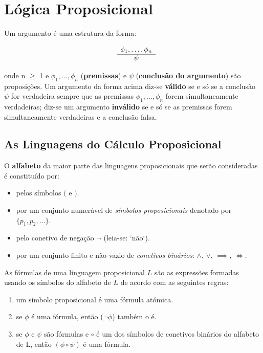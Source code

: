 \section{Lógica Proposicional}

\begin{definition}
    Um argumento é uma estrutura da forma:

    \[
    \begin{array}{ cc }
        & \phi_1, \ldots, \phi_n \\
        \cline{2-2}
        & \psi
    \end{array}
    \]

    onde n $\ge$ 1 e $\phi_1,\ldots{},\phi_n$ (\textbf{premissas}) e $\psi$ (\textbf{conclusão do argumento}) são proposições.
    Um argumento da forma acima diz-se \textbf{válido} se e só se a conclusão $\psi$ for verdadeira sempre que as premissas $\phi_1,\ldots,\phi_n$ forem simultaneamente verdadeiras; diz-se um argumento \textbf{inválido} se e só se as premissas forem simultaneamente verdadeiras e a conclusão falsa.

\end{definition}

\subsection{As Linguagens do Cálculo Proposicional}
O \textbf{alfabeto} da maior parte das linguagens proposicionais que serão consideradas é constituído por:

\begin{itemize}
    \item pelos símbolos $($ e $)$.
    \item por um conjunto numerável de \textit{símbolos proposicionais} denotado por $\{ p_1,p_2, \ldots \}$.
    \item pelo conetivo de negação $\neg$ (leia-se: `não`).
    \item por um conjunto finito e não vazio de \textit{conetivos binários}: $\land$, $\lor$, $\implies$, $\iff$.
\end{itemize}

As fórmulas de uma linguagem proposicional $L$ são as expressões formadas usando os símbolos do alfabeto de $L$ de acordo com as seguintes regras:

\begin{enumerate}[label=(\roman*)]
    \item um símbolo proposicional é uma fórmula atómica.
    \item se $\phi$ é uma fórmula, então ($\neg \phi$) também o é.
    \item se $\phi$ e $\psi$ são fórmulas e $\circ$ é um dos símbolos de conetivos binários do alfabeto de L, então $(\phi\circ\psi)$ é uma fórmula.
\end{enumerate}

